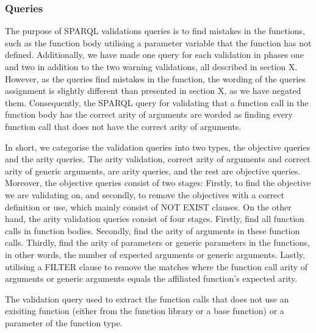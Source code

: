\subsubsection{Queries}
The purpose of SPARQL validations queries is to find mistakes in the functions, such as the function body utilising a parameter variable that the function has not defined. Additionally, we have made one query for each validation in phases one and two in addition to the two warning validations, all described in section X. However, as the queries find mistakes in the function, the wording of the queries assignment is slightly different than presented in section X, as we have negated them. Consequently, the SPARQL query for validating that a function call in the function body has the correct arity of arguments are worded as finding every function call that does not have the correct arity of arguments. 

\para
In short, we categorise the validation queries into two types, the objective queries and the arity queries. The arity validation, correct arity of arguments and correct arity of generic arguments, are arity queries, and the rest are objective queries. Moreover, the objective queries consist of two stages: Firstly, to find the objective we are validating on, and secondly, to remove the objectives with a correct definition or use, which mainly consist of NOT EXIST clauses. On the other hand, the arity validation queries consist of four stages. Firstly, find all function calls in function bodies. Secondly, find the arity of arguments in these function calls. Thirdly, find the arity of parameters or generic parameters in the functions, in other words, the number of expected arguments or generic arguments. Lastly, utilising a FILTER clause to remove the matches where the function call arity of arguments or generic arguments equals the affiliated function's expected arity.

\begin{query}
    The validation query used to extract the function calls that does not use an exisiting function (either from the function library or a base function) or a parameter of the function type. 
    \label{query:functionExists}
\end{query}


